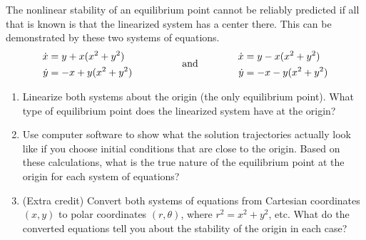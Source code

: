 \documentclass[12pt,letterpaper]{hmcpset}
\renewcommand{\t}[1]{\text{#1}}
\begin{document}
\begin{problem}[2]
    The nonlinear stability of an equilibrium point cannot be reliably
    predicted if all that is known is that the linearized system has a
    center there.  This can be demonstrated by these two systems of
    equations.
    \begin{alignat*}{3}
        \dot{x}&=y+x(x^2+y^2)&\qquad\qquad\raisebox{-.1in}[0mm][0mm]
        {\t{and}}\qquad\qquad\dot{x}&=y-x(x^2+y^2)\\
        \dot{y}&=-x+y(x^2+y^2)&\dot{y}&=-x-y(x^2+y^2)
    \end{alignat*}
    \begin{enumerate}
        \item Linearize both systems about the origin (the only
            equilibrium point). What type of equilibrium point does the
            linearized system have at the origin?
        \item Use computer software to show what the solution
            trajectories actually look like if you choose initial
            conditions that are close to the origin.  Based on these
            calculations, what is the true nature of the equilibrium
            point at the origin for each system of equations?
        \item (Extra credit) Convert both systems of equations from
            Cartesian coordinates $(x,y)$ to polar coordinates
            $(r,\theta)$, where $r^2=x^2+y^2$, etc.  What do the
            converted equations tell you about the stability of the
            origin in each case?
    \end{enumerate}
\end{problem}
\begin{solution}
    \vfill
\end{solution}
\newpage
\end{document}
